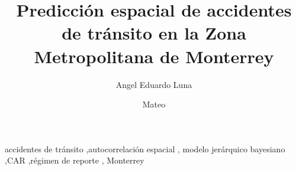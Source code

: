 \documentclass[a4paper,fleqn]{cas-dc}
\begin{document}
\let\WriteBookmarks\relax
\def\floatpagepagefraction{1}
\def\textpagefraction{.001}

\title [mode = title]{Predicción espacial de accidentes de tránsito en la
	Zona Metropolitana de Monterrey}

\author[1]{Angel Eduardo Luna}
\author[1]{Mateo}

\begin{abstract}
	\relax
\end{abstract}

\begin{keywords}
	accidentes de tránsito \sep autocorrelación espacial \sep
	modelo jerárquico bayesiano \sep CAR \sep régimen de reporte \sep
	Monterrey
\end{keywords}

\maketitle








\appendix



\printbibliography
\end{document}
